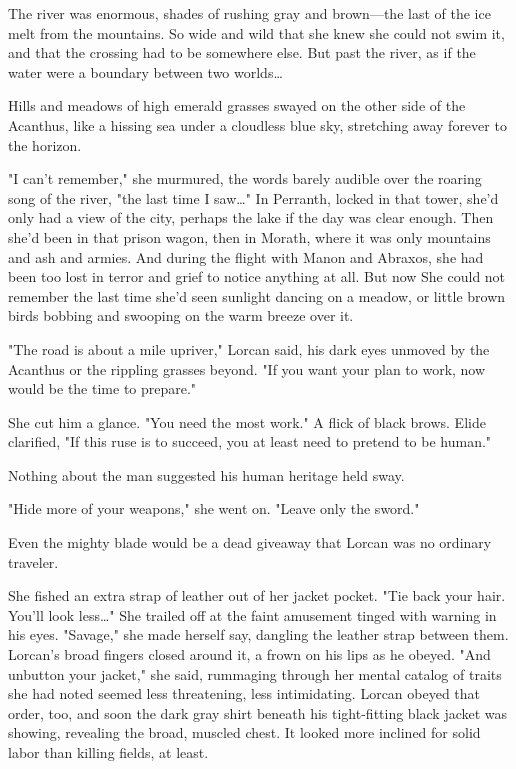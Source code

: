 The river was enormous, shades of rushing gray and brown---the last of the ice melt from the mountains. So wide and wild that she knew she could not swim it, and that the crossing had to be somewhere else. But past the river, as if the water were a boundary between two worlds\ldots{}

Hills and meadows of high emerald grasses swayed on the other side of the Acanthus, like a hissing sea under a cloudless blue sky, stretching away forever to the horizon.

"I can't remember," she murmured, the words barely audible over the roaring song of the river, "the last time I saw\ldots" In Perranth, locked in that tower, she'd only had a view of the city, perhaps the lake if the day was clear enough. Then she'd been in that prison wagon, then in Morath, where it was only mountains and ash and armies. And during the flight with Manon and Abraxos, she had been too lost in terror and grief to notice anything at all. But now  She could not remember the last time she'd seen sunlight dancing on a meadow, or little brown birds bobbing and swooping on the warm breeze over it.

"The road is about a mile upriver," Lorcan said, his dark eyes unmoved by the Acanthus or the rippling grasses beyond. "If you want your plan to work, now would be the time to prepare."

She cut him a glance. "You need the most work." A flick of black brows. Elide clarified, "If this ruse is to succeed, you at least need to  pretend to be human."

Nothing about the man suggested his human heritage held sway.

"Hide more of your weapons," she went on. "Leave only the sword."

Even the mighty blade would be a dead giveaway that Lorcan was no ordinary traveler.

She fished an extra strap of leather out of her jacket pocket. "Tie back your hair. You'll look less\ldots" She trailed off at the faint amusement tinged with warning in his eyes. "Savage," she made herself say, dangling the leather strap between them. Lorcan's broad fingers closed around it, a frown on his lips as he obeyed. "And unbutton your jacket," she said, rummaging through her mental catalog of traits she had noted seemed less threatening, less intimidating. Lorcan obeyed that order, too, and soon the dark gray shirt beneath his tight-fitting black jacket was showing, revealing the broad, muscled chest. It looked more inclined for solid labor than killing fields, at least.

